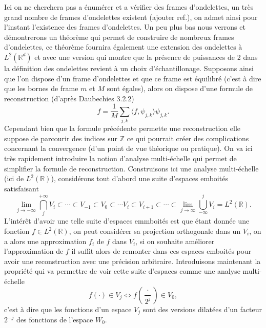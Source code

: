 Ici on ne cherchera pas a énumérer et a vérifier des frames d'ondelettes, un très grand nombre de frames d'ondelettes existent (ajouter ref.), on admet ainsi pour l'instant l'existence des frames d'ondelettes.
Un peu plus bas nous verrons et démontrerons un théorème qui permet de construire de nombreux frames d'ondelettes, ce théorème fournira également une extension des ondelettes à $L^2(\mathbb{R}^d)$ et avec une version qui montre que la présence de puissances de 2 dans la définition des ondelettes revient à un choix d'échantillonage. 
\newline
Supposons ainsi que l'on dispose d'un frame d'ondelettes et que ce frame est équilibré (c'est à dire que les bornes de frame $m$ et $M$ sont égales), alors on dispose d'une formule de reconstruction (d'après Daubechies 3.2.2)
\begin{equation}
	f = \frac{1}{M} \sum_{j,k} \langle f, \psi_{j,k}\rangle \psi_{j,k}.
\end{equation}
Cependant bien que la formule précédente permette une reconstruction elle suppose de parcourir des indices sur $\mathbb{Z}$ ce qui pourrait créer des complications concernant la convergence (d'un point de vue théorique ou pratique).
On va ici très rapidement introduire la notion d'analyse multi-échelle qui permet de simplifier la formule de reconstruction.
Construisons ici une analyse multi-échelle (ici de $L^2(\mathbb{R})$), considérons tout d'abord une suite d'espaces emboités satisfaisant 
\begin{equation*}
	\lim_{j\to -\infty} \bigcap_{j}^{+\infty} V_i \subset \cdots \subset V_{-1} \subset V_0 \subset \cdots V_i \subset V_{i+1} \subset \cdots \subset \lim_{j\to \infty} \bigcup_{-\infty}^{j} V_i = L^2(\mathbb{R}).  
\end{equation*}
L'intérêt d'avoir une telle suite d'espaces emmboités est que étant donnée une fonction $f\in L^2(\mathbb{R})$, on peut considérer sa projection orthogonale dans un $V_i$, on a alors une approximation $f_i$ de $f$ dans $V_i$, si on souhaite améliorer l'approximation de $f$ il suffit alors de remonter dans ces espaces emboités pour avoir une reconstruction avec une précision arbitraire.
Introduisons maintenant la propriété qui va permettre de voir cette suite d'espaces comme une analyse multi-échelle
\begin{equation}
	f(\cdot) \in V_j \iff f(\frac{\cdot}{2^j}) \in V_0,
\end{equation}
c'est à dire que les fonctions d'un espace $V_j$ sont des versions dilatées d'un facteur $2^{-j}$ des fonctions de l'espace $W_0$.
